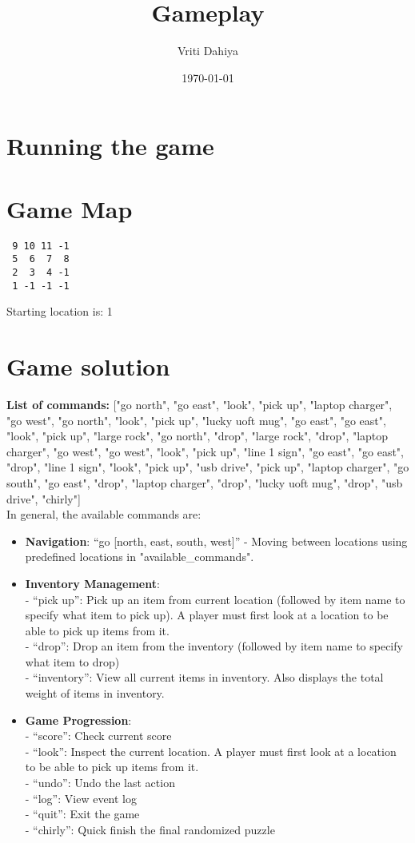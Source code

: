 \documentclass[11pt]{article}
\title{Gameplay}
\author{Vriti Dahiya}
\date{\today}
\begin{document}
\maketitle

\section*{Running the game}
\section*{Game Map}

\begin{verbatim}
 9 10 11 -1
 5  6  7  8
 2  3  4 -1
 1 -1 -1 -1
\end{verbatim}
Starting location is: 1
\section*{Game solution}
\textbf{List of commands:} ["go north", "go east", "look", "pick up", "laptop charger", "go west", "go north", "look", "pick up", "lucky uoft mug", "go east", "go east", "look", "pick up", "large rock", "go north", "drop", "large rock", "drop", "laptop charger", "go west", "go west", "look", "pick up", "line 1 sign", "go east", "go east", "drop", "line 1 sign", "look", "pick up", "usb drive", "pick up", "laptop charger", "go south", "go east", "drop", "laptop charger", "drop", "lucky uoft mug", "drop", "usb drive", "chirly"]\\

In general, the available commands are:
\begin{itemize}
    \item \textbf{Navigation}: ``go [north, east, south, west]'' - Moving between locations using predefined locations in "available\_commands".
    \item \textbf{Inventory Management}:\\
    - ``pick up'': Pick up an item from current location (followed by item name to specify what item to pick up). A player must first look at a location to be able to pick up items from it.\\
    - ``drop'': Drop an item from the inventory (followed by item name to specify what item to drop)\\
    - ``inventory'': View all current items in inventory. Also displays the total weight of items in inventory.
    \item \textbf{Game Progression}: \\
    - ``score'': Check current score\\
    - ``look'': Inspect the current location. A player must first look at a location to be able to pick up items from it.\\
    - ``undo'': Undo the last action\\
    - ``log'': View event log\\
    - ``quit'': Exit the game\\
    - ``chirly'': Quick finish the final randomized puzzle

\end{itemize}
\end{document}
